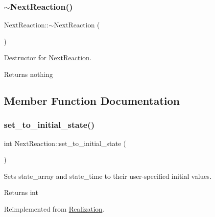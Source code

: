 \subsubsection{\texorpdfstring{$\sim$\+Next\+Reaction()}{~NextReaction()}}
{\footnotesize\ttfamily Next\+Reaction\+::$\sim$\+Next\+Reaction (\begin{DoxyParamCaption}{ }\end{DoxyParamCaption})}



Destructor for \hyperlink{class_next_reaction}{Next\+Reaction}. 

\begin{DoxyReturn}{Returns}
nothing 
\end{DoxyReturn}


\subsection{Member Function Documentation}
\mbox{\label{class_next_reaction_a0cc63c4ec9fe3f338472fff302f6d746}} 
\subsubsection{\texorpdfstring{set\+\_\+to\+\_\+initial\+\_\+state()}{set\_to\_initial\_state()}}
{\footnotesize\ttfamily int Next\+Reaction\+::set\+\_\+to\+\_\+initial\+\_\+state (\begin{DoxyParamCaption}{ }\end{DoxyParamCaption})\hspace{0.3cm}{\ttfamily [virtual]}}



Sets state\+\_\+array and state\+\_\+time to their user-\/specified initial values. 

\begin{DoxyReturn}{Returns}
int 
\end{DoxyReturn}


Reimplemented from \hyperlink{class_realization_a391a89af7574a9053f53f8a299c2cc70}{Realization}.

\mbox{\label{class_next_reaction_a2c1502879c76efe398c2947056936725}} 
